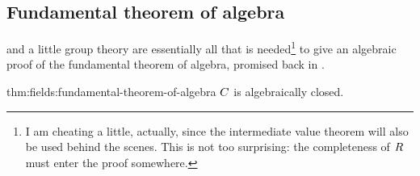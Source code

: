 \subsection{Fundamental theorem of algebra}
\label{subsec:fields:fundamental-theorem-of-algebra}
 and a little group theory are essentially all
that is needed\footnote{I am cheating a little, actually, since the
  intermediate value theorem will also be used behind the scenes. This
  is not too surprising: the completeness of $R$ must enter the proof
  somewhere.}  to give an algebraic proof of the fundamental theorem
of algebra, promised back in
.
\begin{thm}{}{thm:fields:fundamental-theorem-of-algebra}
  $C$ is algebraically closed.
\end{thm}

